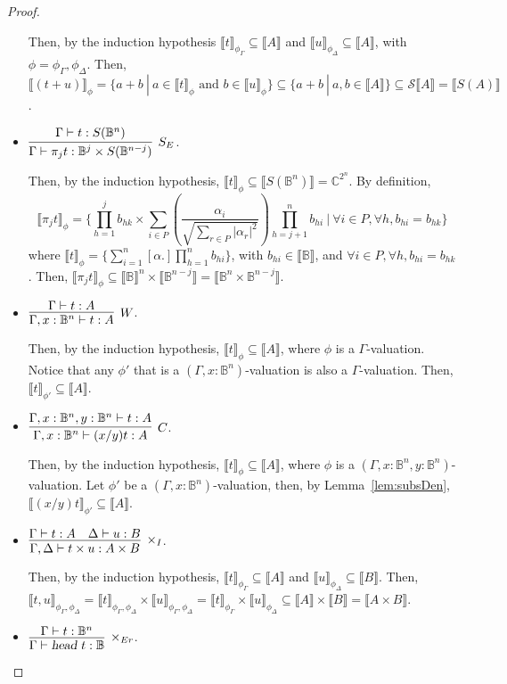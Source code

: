 \documentclass[preprint]{elsarticle}
\newcommand\B{\ensuremath{\mathbb B}}
\newcommand\pair[2]{({#1}+{#2})}
\newcommand\head{\text{\sl head}}
\newcommand\may[1][\alpha]{[{#1}.]}
\newcommand\gen{\mathcal S} \newcommand\den[1]{\llbracket #1 \rrbracket}
\begin{document}
\begin{proof}
\begin{itemize}
    Then, by the induction hypothesis $\den t_{\phi_\Gamma}\subseteq\den A$ and
    $\den u_{\phi_\Delta}\subseteq\den A$, with $\phi=\phi_\Gamma,\phi_\Delta$.
    Then,
    $\den{\pair tu}_\phi=\{a+b~|~a\in\den t_\phi\textrm{ and }b\in\den
    u_\phi\}\subseteq\{a+b~|~a,b\in\den A\}\subseteq\gen\den A=\den{S(A)}$.
  \item $\vcenter{\infer[S_E]{{\Gamma\vdash\pi_j t:\B^j\times
          S(\B^{n-j})}}{{\Gamma\vdash t:S(\B^n)}}}$.

    Then, by the induction hypothesis, $\den
    t_\phi\subseteq\den{S(\B^n)}=\mathbb C^{2^n}$. By definition,
    \[
      \den{\pi_jt}_\phi=\{\prod_{h=1}^jb_{hk}\times\sum_{i\in
        P}\left(\frac{\alpha_i}{\sqrt{\sum_{r\in
              P}|\alpha_r|^2}}\right)\prod_{h=j+1}^nb_{hi}~|~\forall i\in
      P,\forall h,b_{hi}=b_{hk}\}
    \]
    where $\den t_\phi=\{\sum_{i=1}^n \may\prod_{h=1}^n b_{hi}\}$, with
    $b_{hi}\in\den{\B}$, and $\forall i\in P, \forall h, b_{hi}=b_{hk}$. Then,
    $\den{\pi_jt}_\phi \subseteq\den{\B}^n\times\den{\B^{n-j}}
    =\den{\B^n\times\B^{n-j}}$.
  \item $\vcenter{\infer[W]{{\Gamma,x:\B^n\vdash t:A}}{{\Gamma\vdash t:A}}}$.

    Then, by the induction hypothesis, $\den t_\phi\subseteq\den A$, where
    $\phi$ is a $\Gamma$-valuation. Notice that any $\phi'$ that is a
    $(\Gamma,x:\B^n)$-valuation is also a $\Gamma$-valuation. Then, $\den
    t_{\phi'}\subseteq\den A$.
  \item $\vcenter{\infer[C]{{\Gamma,x:\B^n\vdash (x/y)t:A}}{{\Gamma,x:\B^n,y:\B^n\vdash t:A}}}$.

    Then, by the induction hypothesis, $\den t_\phi\subseteq\den A$, where
    $\phi$ is a $(\Gamma,x:\B^n,y:\B^n)$-valuation. Let $\phi'$ be a
    $(\Gamma,x:\B^n)$-valuation, then, by Lemma~\ref{lem:subsDen},
    $\den{(x/y)t}_{\phi'}\subseteq\den A$.
  \item $\vcenter{\infer[\times_I]{{\Gamma,\Delta\vdash t\times u:A\times
          B}}{\Gamma\vdash t:A & \Delta\vdash u:B}}$.


    Then, by the induction hypothesis, $\den t_{\phi_\Gamma}\subseteq\den A$ and
    $\den u_{\phi_\Delta}\subseteq\den B$. Then,
    $\den{t,u}_{\phi_\Gamma,\phi_\Delta}
    =\den t_{\phi_\Gamma,\phi_\Delta}\times\den u_{\phi_\Gamma,\phi_\Delta}
    =\den t_{\phi_\Gamma}\times\den u_{\phi_\Delta}
    \subseteq \den A\times\den B
    =\den{A\times B}$.
  \item $\vcenter{\infer[\times_{Er}]{{\Gamma\vdash \head~t:\B}}{{\Gamma\vdash t:\B^n}}}$.


\end{itemize}
\end{proof}
\end{document}
